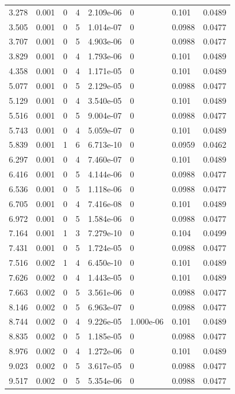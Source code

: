 \documentclass[preview]{standalone}
\begin{document}
{{\begin{tabular}{L{1.2cm}C{1.2cm} C{0.3cm}C{0.5cm} C{1.4cm}C{1.4cm} C{1.4cm}C{1.4cm}}
  3.278  &  0.001  & 0     &  4 &  2.109e-06  & 0  & 0.101 &  0.0489   \\ 
  3.505  &  0.001  & 0     &  5 &  1.014e-07  & 0  & 0.0988 &  0.0477   \\ 
  3.707  &  0.001  & 0     &  5 &  4.903e-06  & 0  & 0.0988 &  0.0477   \\ 
  3.829  &  0.001  & 0     &  4 &  1.793e-06  & 0  & 0.101 &  0.0489   \\ 
  4.358  &  0.001  & 0     &  4 &  1.171e-05  & 0  & 0.101 &  0.0489   \\ 
  5.077  &  0.001  & 0     &  5 &  2.129e-05  & 0  & 0.0988 &  0.0477   \\ 
  5.129  &  0.001  & 0     &  4 &  3.540e-05  & 0  & 0.101 &  0.0489   \\ 
  5.516  &  0.001  & 0     &  5 &  9.004e-07  & 0  & 0.0988 &  0.0477   \\ 
  5.743  &  0.001  & 0     &  4 &  5.059e-07  & 0  & 0.101 &  0.0489   \\ 
  5.839  &  0.001  & 1     &  6 &  6.713e-10  & 0  & 0.0959 &  0.0462   \\ 
  6.297  &  0.001  & 0     &  4 &  7.460e-07  & 0  & 0.101 &  0.0489   \\ 
  6.416  &  0.001  & 0     &  5 &  4.144e-06  & 0  & 0.0988 &  0.0477   \\ 
  6.536  &  0.001  & 0     &  5 &  1.118e-06  & 0  & 0.0988 &  0.0477   \\ 
  6.705  &  0.001  & 0     &  4 &  7.416e-08  & 0  & 0.101 &  0.0489   \\ 
  6.972  &  0.001  & 0     &  5 &  1.584e-06  & 0  & 0.0988 &  0.0477   \\ 
  7.164  &  0.001  & 1     &  3 &  7.279e-10  & 0  & 0.104 &  0.0499   \\ 
  7.431  &  0.001  & 0     &  5 &  1.724e-05  & 0  & 0.0988 &  0.0477   \\ 
  7.516  &  0.002  & 1     &  4 &  6.450e-10  & 0  & 0.101 &  0.0489   \\ 
  7.626  &  0.002  & 0     &  4 &  1.443e-05  & 0  & 0.101 &  0.0489   \\ 
  7.663  &  0.002  & 0     &  5 &  3.561e-06  & 0  & 0.0988 &  0.0477   \\ 
  8.146  &  0.002  & 0     &  5 &  6.963e-07  & 0  & 0.0988 &  0.0477   \\ 
  8.744  &  0.002  & 0     &  4 &  9.226e-05  & 1.000e-06  & 0.101 &  0.0489   \\ 
  8.835  &  0.002  & 0     &  5 &  1.185e-05  & 0  & 0.0988 &  0.0477   \\ 
  8.976  &  0.002  & 0     &  4 &  1.272e-06  & 0  & 0.101 &  0.0489   \\ 
  9.023  &  0.002  & 0     &  5 &  3.617e-05  & 0  & 0.0988 &  0.0477   \\ 
  9.517  &  0.002  & 0     &  5 &  5.354e-06  & 0  & 0.0988 &  0.0477   \\ 
\hline 
\end{tabular} 

}}
\end{document}
